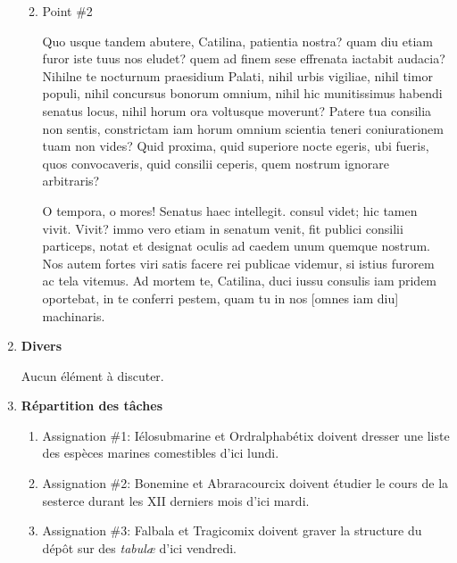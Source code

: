 \documentclass[12pt]{ULojpv}
\begin{document}
\begin{enumerate}
\begin{enumerate}
\begin{enumerate}
\end{enumerate}

\item Point \#2

Quo usque tandem abutere, Catilina, patientia nostra? quam diu etiam furor iste tuus nos eludet? quem ad finem sese effrenata iactabit audacia? Nihilne te nocturnum praesidium Palati, nihil urbis vigiliae, nihil timor populi, nihil concursus bonorum omnium, nihil hic munitissimus habendi senatus locus, nihil horum ora voltusque moverunt? Patere tua consilia non sentis, constrictam iam horum omnium scientia teneri coniurationem tuam non vides? Quid proxima, quid superiore nocte egeris, ubi fueris, quos convocaveris, quid consilii ceperis, quem nostrum ignorare arbitraris?

O tempora, o mores! Senatus haec intellegit. consul videt; hic tamen vivit. Vivit? immo vero etiam in senatum venit, fit publici consilii particeps, notat et designat oculis ad caedem unum quemque nostrum. Nos autem fortes viri satis facere rei publicae videmur, si istius furorem ac tela vitemus. Ad mortem te, Catilina, duci iussu consulis iam pridem oportebat, in te conferri pestem, quam tu in nos [omnes iam diu] machinaris.

\end{enumerate}


\item \textbf{Divers}

Aucun élément à discuter.


\item \textbf{Répartition des tâches}

\begin{enumerate}

\item Assignation \#1: Iélosubmarine et Ordralphabétix doivent dresser une liste des espèces marines comestibles d'ici lundi.

\item Assignation \#2: Bonemine et Abraracourcix doivent étudier le cours de la sesterce durant les XII derniers mois d'ici mardi.

\item Assignation \#3: Falbala et Tragicomix doivent graver la structure du dépôt  sur des \emph{tabul\ae{}} d'ici vendredi.


\end{enumerate}
\end{enumerate}
\end{document}
